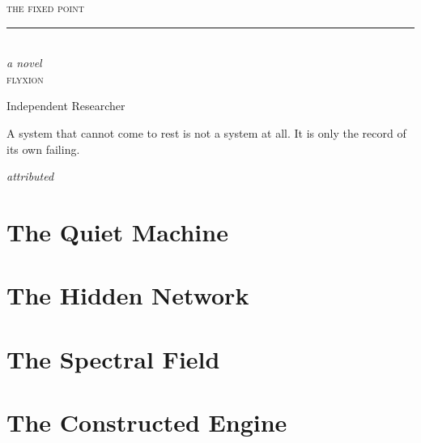 \documentclass[12pt, openany]{book}
\newcommand{\customtitlepage}{%
  \thispagestyle{empty}
  \vspace*{3.5cm}
  \begin{center}
    {\Large\scshape the fixed point}\\[2.8ex]
    {\color{ruledline}\rule{0.38\textwidth}{0.4pt}}\\[2.8ex]
    {\normalsize\itshape a novel}\\[5.2cm]
    {\small\scshape flyxion}
  \end{center}
  \vfill
  \begin{center}
    {\footnotesize\color{ruledline}Independent Researcher}
  \end{center}
  \clearpage
}
\begin{document}
\frontmatter

\customtitlepage

\thispagestyle{empty}
\vspace*{4.8cm}
\epigraph{%
  A system that cannot come to rest is not a system at all.
  It is only the record of its own failing.%
}{%
  \textit{attributed}%
}
\clearpage

\tableofcontents
\clearpage

\mainmatter



\part{The Quiet Machine}








\part{The Hidden Network}








\part{The Spectral Field}








\part{The Constructed Engine}







\backmatter


\end{document}
